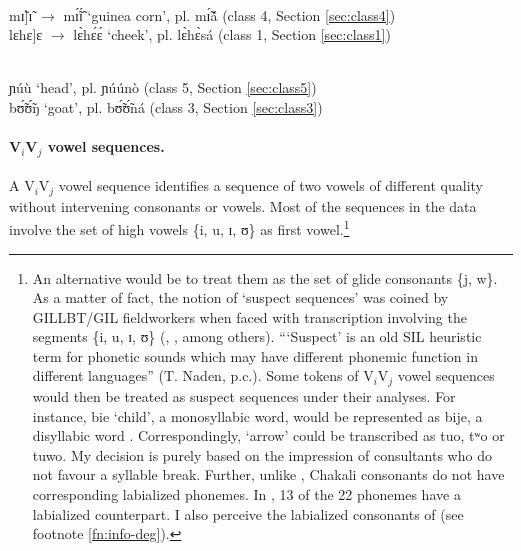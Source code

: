 \begin{exe}
\ex\label{ex:V1V1vowel-seq}
\begin{xlist}

\ex  {\rm V$_{i}$]-V$_{i}$: a morpheme boundary intervenes} \\
 mɪ̃]ɪ̃ $\rightarrow$ mɪ̃́ɪ̃́  {\rm `guinea corn'}, {\sc pl.} mɪ̃́ã́  {\rm 
 ({\sc class 4}, Section \ref{sec:class4})} \\
  lɛhɛ]ɛ  $\rightarrow$  lɛ̀hɛ́ɛ́  {\rm `cheek'},  {\sc pl.}   lɛ̀hɛ̀sá  
{\rm ({\sc class 1},  Section \ref{sec:class1})}


 \\
ɲúù {\rm  `head'}, {\sc pl.} ɲúúnò {\rm  ({\sc class 5}, Section 
\ref{sec:class5})}\\	
bʊ̃́ʊ̃́ŋ	 {\rm  `goat'}, {\sc pl.} bʊ̃́ʊ̃́ná  
{\rm  ({\sc class 3}, Section \ref{sec:class3})}
\end{xlist}
\end{exe}





\newpage
\paragraph{V$_{i}$V$_{j}$ vowel sequences.}
\label{sec:V1V2vowel-seq}

A V$_{i}$V$_{j}$ vowel sequence identifies a sequence of two vowels of different 
quality without intervening consonants or vowels.
Most of the sequences in the 
data involve  the set of high vowels \{{i, u, ɪ, ʊ}\}  as first 
vowel.\footnote{\label{fn:deg-labial} An alternative would be to treat them as 
the set of glide consonants \{{j, w}\}. As a matter of fact, the notion of  `suspect 
sequences' 
was coined by GILLBT/GIL fieldworkers when faced with  transcription 
  involving the segments  \{i, u, ɪ, ʊ\} (\citealt[4]{Gray69}, 
\citealt[8]{Toup95}, among others). ```Suspect' is an old SIL heuristic term for phonetic sounds 
which may have different phonemic function in different languages'' (T. Naden, p.c.).
Some  tokens of V$_{i}$V$_{j}$ vowel 
sequences  would then be treated as suspect sequences under their analyses. For 
instance, {\sls bie} `child', a monosyllabic word,  would be represented as 
{\sls bije}, a disyllabic word \citep[see also][100]{Kedr97}. Correspondingly,  `arrow' could be 
transcribed as {\sls tuo}, {\sls tʷo} or {\sls tuwo}.  My decision is purely 
based 
on the impression of  consultants who do not favour a syllable break.  Further, 
unlike  , Chakali consonants do not have corresponding  labialized  phonemes. 
In \citet[2]{Crou03},  13 of the 22 phonemes have a labialized 
counterpart. I also perceive the labialized consonants of  (see footnote 
\ref{fn:info-deg}).}


